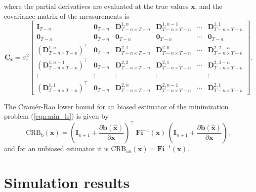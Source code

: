 where the partial derivatives are evaluated at the true values $\mathbf{x}$, and the covariance matrix of the measurements is
\begin{equation} \mathbf{C}_{\mathbf{z}} = \sigma_{\epsilon}^2 \begin{bmatrix} \mathbf{I}_{T-n} & \mathbf{0}_{T-n} & \mathbf{D}_{T-n \times T-n}^{1,n} & \mathbf{D}_{T-n \times T-n}^{1,n-1} & \cdots & \mathbf{D}_{T-n \times T-n}^{1,1} \\ \mathbf{0}_{T-n} & \mathbf{0}_{T-n} & \mathbf{0}_{T-n} & \mathbf{0}_{T-n} & \cdots & \mathbf{0}_{T-n} \\ \left( \mathbf{D}_{T-n \times T-n}^{1,n} \right)^\top & \mathbf{0}_{T-n} & \mathbf{D}_{T-n \times T-n}^{2,1} & \mathbf{D}_{T-n \times T-n}^{2,0} & \cdots & \mathbf{D}_{T-n \times T-n}^{2,2-n} \\ \left( \mathbf{D}_{T-n \times T-n}^{1,n-1} \right)^\top & \mathbf{0}_{T-n} & \mathbf{D}_{T-n \times T-n}^{2,2} & \mathbf{D}_{T-n \times T-n}^{2,1} & \cdots & \mathbf{D}_{T-n \times T-n}^{2,3-n} \\ \vdots & \vdots & \vdots & \vdots & & \vdots \\ \left( \mathbf{D}_{T-n \times T-n}^{1,1} \right)^\top & \mathbf{0}_{T-n} & \mathbf{D}_{T-n \times T-n}^{2,n} & \mathbf{D}_{T-n \times T-n}^{2,n-1} & \cdots & \mathbf{D}_{T-n \times T-n}^{2,1} \end{bmatrix} .
 \label{eqn:Cz} \end{equation} 

The Cram\'er-Rao lower bound for an biased estimator of the minimization problem (\ref{eqn:min_ls}) is given by
\begin{equation} \mathrm{CRB}_{\mathrm{b}}(\mathbf{x}) = \left( \mathbf{I}_{n+1} + \frac{\partial \mathbf{b} \left( \widehat{\mathbf{x}} \right) }{\partial \mathbf{x} } \right)^\top \ \mathbf{Fi}^{-1}(\mathbf{x}) \ \left( \mathbf{I}_{n+1} + \frac{\partial \mathbf{b} \left( \widehat{\mathbf{x}} \right) }{\partial \mathbf{x} } \right), \label{eqn:CRB_EIV} \end{equation} 
and for an unbiased estimator it is $\mathrm{CRB}_{\mathrm{ub}}(\mathbf{x}) = \mathbf{Fi}^{-1}(\mathbf{x})$.


\section{Simulation results}

